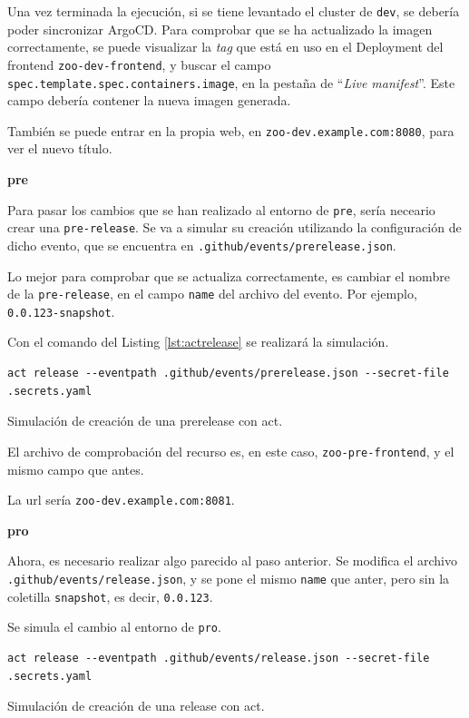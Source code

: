 \begin{enumerate}
    Una vez terminada la ejecución, si se tiene levantado el cluster de \texttt{dev}, se debería poder sincronizar ArgoCD. Para comprobar que se ha actualizado la imagen correctamente, se puede visualizar la \textit{tag} que está en uso en el Deployment del frontend \texttt{zoo-dev-frontend}, y buscar el campo \texttt{spec.template.spec.containers.image}, en la pestaña de ``\textit{Live manifest}''. Este campo debería contener la nueva imagen generada.

    También se puede entrar en la propia web, en \texttt{zoo-dev.example.com:8080}, para ver el nuevo título.

    \textbf{pre}

    Para pasar los cambios que se han realizado al entorno de \texttt{pre}, sería neceario crear una \texttt{pre-release}. Se va a simular su creación utilizando la configuración de dicho evento, que se encuentra en \texttt{.github/events/prerelease.json}.

    Lo mejor para comprobar que se actualiza correctamente, es cambiar el nombre de la \texttt{pre-release}, en el campo \texttt{name} del archivo del evento. Por ejemplo, \texttt{0.0.123-snapshot}.

    Con el comando del Listing \ref{lst:actrelease} se realizará la simulación.

\begin{listing}[!ht]
  \begin{verbatim}
act release --eventpath .github/events/prerelease.json --secret-file .secrets.yaml
  \end{verbatim}
    \caption{Simulación de creación de una prerelease con act.}
  \label{lst:actrelease}
\end{listing}

    El archivo de comprobación del recurso es, en este caso, \texttt{zoo-pre-frontend}, y el mismo campo que antes.

    La url sería \texttt{zoo-dev.example.com:8081}.

    \textbf{pro}

    Ahora, es necesario realizar algo parecido al paso anterior. Se modifica el archivo \texttt{.github/events/release.json}, y se pone el mismo \texttt{name} que anter, pero sin la coletilla \texttt{snapshot}, es decir, \texttt{0.0.123}.

    Se simula el cambio al entorno de \texttt{pro}.

\begin{listing}[!ht]
  \begin{verbatim}
act release --eventpath .github/events/release.json --secret-file .secrets.yaml
  \end{verbatim}
    \caption{Simulación de creación de una release con act.}
\end{listing}

\end{enumerate}

